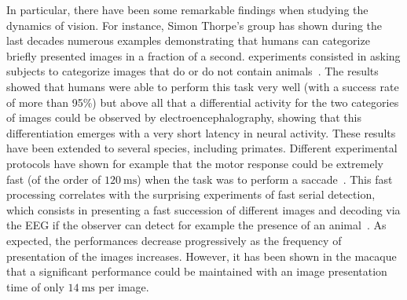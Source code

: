 \documentclass[brainsci, %
               review,submit,pdftex,moreauthors
               ]{Definitions/mdpi}
\newcommand{\ms}{\si{\milli\second}}%
\begin{document}
In particular, there have been some remarkable findings when studying the dynamics of vision. For instance, Simon Thorpe's group has shown during the last decades numerous examples demonstrating that humans can categorize briefly presented images in a fraction of a second.  experiments consisted in asking subjects to categorize images that do or do not contain animals~\citep{thorpe_speed_1996}. The results showed that humans were able to perform this task very well (with a success rate of more than 95\%) but above all that a differential activity for the two categories of images could be observed by electroencephalography, showing that this differentiation emerges with a very short latency in neural activity. These results have been extended to several species, including primates. Different experimental protocols have shown for example that the motor response could be extremely fast (of the order of $120~\ms$) when the task was to perform a saccade~\citep{kirchner_ultra-rapid_2006}. This fast processing correlates with the surprising experiments of fast serial detection, which consists in presenting a fast succession of different images and decoding via the EEG if the observer can detect for example the presence of an animal~\citep{keysers_speed_2001}. As expected, the performances decrease progressively as the frequency of presentation of the images increases. However, it has been shown in the macaque that a significant performance could be maintained with an image presentation time of only $14~\ms$ per image.
\end{document}
